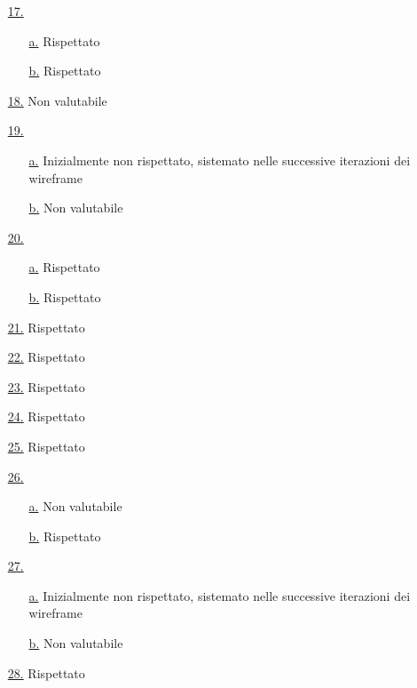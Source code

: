 \begin{itemize}
    \item[{\hyperref[lg:17]{17.}}] \begin{itemize}
        \item[{\hyperref[lg:17.a]{a.}}] Rispettato
        \item[{\hyperref[lg:17.b]{b.}}] Rispettato
    \end{itemize}
    \item[{\hyperref[lg:18]{18.}}] Non valutabile
    \item[{\hyperref[lg:19]{19.}}] \begin{itemize}
        \item[{\hyperref[lg:19.a]{a.}}] Inizialmente non rispettato, sistemato nelle successive iterazioni dei wireframe
        \item[{\hyperref[lg:19.b]{b.}}] Non valutabile
    \end{itemize}
    \item[{\hyperref[lg:20]{20.}}] \begin{itemize}
        \item[{\hyperref[lg:20.a]{a.}}] Rispettato
        \item[{\hyperref[lg:20.b]{b.}}] Rispettato
    \end{itemize}
    \item[{\hyperref[lg:21]{21.}}] Rispettato
    \item[{\hyperref[lg:22]{22.}}] Rispettato
    \item[{\hyperref[lg:23]{23.}}] Rispettato
    \item[{\hyperref[lg:24]{24.}}] Rispettato
    \item[{\hyperref[lg:25]{25.}}] Rispettato
    \item[{\hyperref[lg:26]{26.}}] \begin{itemize}
        \item[{\hyperref[lg:26.a]{a.}}] Non valutabile
        \item[{\hyperref[lg:26.b]{b.}}] Rispettato
    \end{itemize}
    \item[{\hyperref[lg:27]{27.}}] \begin{itemize}
        \item[{\hyperref[lg:27.a]{a.}}] Inizialmente non rispettato, sistemato nelle successive iterazioni dei wireframe
        \item[{\hyperref[lg:27.b]{b.}}] Non valutabile
    \end{itemize}
    \item[{\hyperref[lg:28]{28.}}] Rispettato

\end{itemize}

